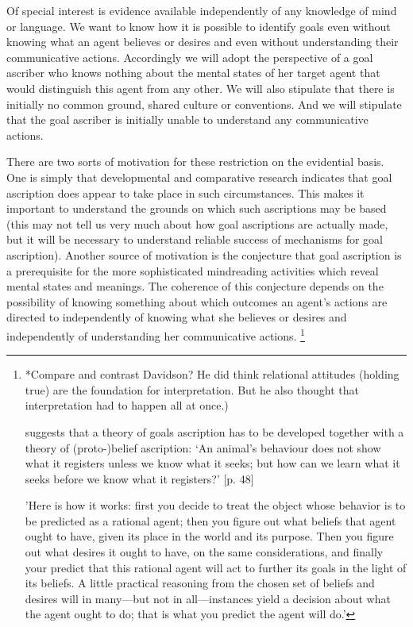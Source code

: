 \documentclass[12pt,a4paper]{extarticle}
\begin{document}
Of special interest is evidence available independently of any knowledge of mind or language.
We want to know how it is possible to identify goals even without knowing what an agent believes or desires and even without understanding their communicative actions.
Accordingly we will adopt the perspective of a goal ascriber who knows nothing about the mental states of her target agent that would distinguish this agent from any other.
We will also stipulate that there is initially no common ground, shared culture or conventions.
And we will stipulate that the goal ascriber is initially unable to understand any communicative actions.

There are two sorts of motivation for these restriction on the evidential basis.
One is simply that developmental and comparative research indicates that goal ascription does appear to take place  in such circumstances.
This makes it important to understand the grounds on which such ascriptions may be based (this may not tell us very much about how goal ascriptions are actually made, but it will be necessary to understand reliable success of mechanisms for goal ascription).
Another source of motivation is the conjecture that goal ascription is a prerequisite for the more sophisticated mindreading activities which reveal mental states and meanings.
The coherence of this conjecture depends on the possibility of knowing something about which outcomes an agent's actions are directed to independently of knowing what she believes or desires and independently of understanding her communicative actions.%
\footnote{
*Compare and contrast Davidson?
He did think relational attitudes (holding true) are the foundation for interpretation.
But he also thought that interpretation had to happen all at once.)

\citet[pp.48--50]{Bennett:1976rg} suggests that a theory of goals ascription has to be developed together with a theory of (proto-)belief ascription: `An animal’s behaviour does not show what it registers unless we know what it seeks; but how can we learn what it seeks before we know what it registers?' [p. 48]

\citet[p.\ 17]{Dennett:1987sf} 'Here is how it works: first you decide to treat the object whose behavior is to be predicted as a rational agent; then you figure out what beliefs that agent ought to have, given its place in the world and its purpose.   Then you figure out what desires it ought to have, on the same considerations, and finally your predict that this rational agent will act to further its goals in the light of its beliefs.  A little practical reasoning from the chosen set of beliefs and desires will in many—but not in all—instances yield a decision about what the agent ought to do; that is what you predict the agent will do.'
}
\end{document}
